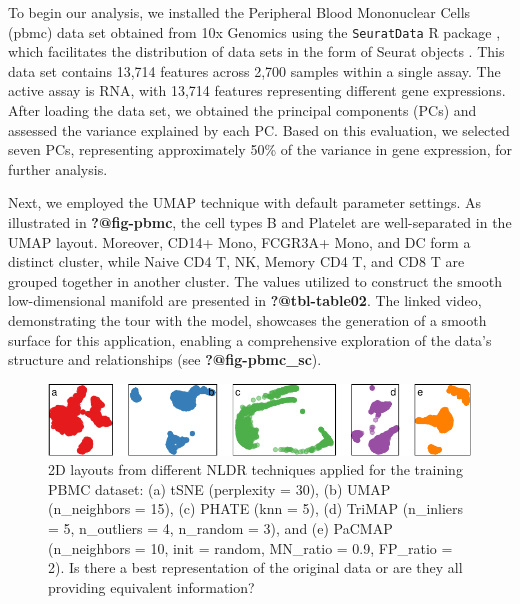 \documentclass[
  12pt]{article}
\begin{document}
To begin our analysis, we installed the Peripheral Blood Mononuclear
Cells (pbmc) data set obtained from 10x Genomics using the
\texttt{SeuratData} R package \citep{Rahul2019}, which facilitates the
distribution of data sets in the form of Seurat objects
\citep{Yuhan2021}. This data set contains 13,714 features across 2,700
samples within a single assay. The active assay is RNA, with 13,714
features representing different gene expressions. After loading the data
set, we obtained the principal components (PCs) and assessed the
variance explained by each PC. Based on this evaluation, we selected
seven PCs, representing approximately 50\% of the variance in gene
expression, for further analysis.

Next, we employed the UMAP technique with default parameter settings. As
illustrated in \textbf{?@fig-pbmc}, the cell types B and Platelet are
well-separated in the UMAP layout. Moreover, CD14+ Mono, FCGR3A+ Mono,
and DC form a distinct cluster, while Naive CD4 T, NK, Memory CD4 T, and
CD8 T are grouped together in another cluster. The values utilized to
construct the smooth low-dimensional manifold are presented in
\textbf{?@tbl-table02}. The linked video, demonstrating the tour with
the model, showcases the generation of a smooth surface for this
application, enabling a comprehensive exploration of the data's
structure and relationships (see \textbf{?@fig-pbmc\_sc}).

\begin{figure}

{\centering \includegraphics[width=1\textwidth,height=\textheight]{paper_files/figure-pdf/fig-nldervis5PBMC-1.pdf}

}

\caption{\label{fig-nldervis5PBMC}2D layouts from different NLDR
techniques applied for the training PBMC dataset: (a) tSNE (perplexity =
30), (b) UMAP (n\_neighbors = 15), (c) PHATE (knn = 5), (d) TriMAP
(n\_inliers = 5, n\_outliers = 4, n\_random = 3), and (e) PaCMAP
(n\_neighbors = 10, init = random, MN\_ratio = 0.9, FP\_ratio = 2). Is
there a best representation of the original data or are they all
providing equivalent information?}

\end{figure}
\end{document}
